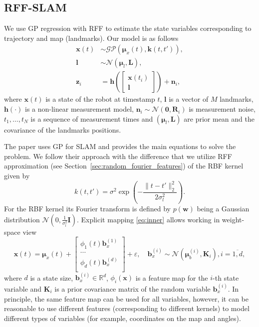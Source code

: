 \subsection{RFF-SLAM}

We use GP regression with RFF to estimate the state variables corresponding to trajectory and map (landmarks).
Our model is as follows
\begin{equation}
\label{eq:gp_slam_model}
    \begin{aligned}
        \bm{x}(t) &\sim \mathcal{GP}(\bm{\mu}_x(t), \bm{k}(t, t')), \\
        \bm{l} &\sim \mathcal{N}(\bm{\mu}_l, \mathbf{L}), \\
        \bm{z}_i &= \bm{h}\left (
        \begin{bmatrix}
            {\bm x}(t_i) \\
            {\bm l}
        \end{bmatrix}
        \right ) + \bm{n}_i,
    \end{aligned}
\end{equation}
where ${\bm x}(t)$ is a state of the robot at timestamp $t$,
${\bm l}$ is a vector of $M$ landmarks,
$\bm{h}(\cdot)$ is a non-linear measurement model,
$\bm{n}_i \sim \mathcal{N}(\bm{0}, \mathbf{R}_i)$ is measurement noise,
$t_1, \ldots, t_N$ is a sequence of measurement times and
$(\bm{\mu}_l, \mathbf{L})$ are prior mean and the covariance of the landmarks positions.

The paper \cite{tong2013gaussian} uses GP for SLAM and provides the main equations to solve the problem.
We follow their approach with the difference that we utilize RFF approximation
(see Section~\ref{sec:random_fourier_features}) of the RBF kernel given by
\[
k(t, t') = \sigma^2 \exp \left ( -\frac{\|t - t'\|_2^2}{2 \sigma_l^2} \right ).
\]
For the RBF kernel its Fourier transform is defined by $p(\bm{w})$ being a Gaussian distribution $\mathcal{N}\left (0, \frac{1}{\sigma_l^2}\mathbf{I} \right )$.
Explicit mapping \eqref{eq:inner} allows working in
weight-space view
\[
{\bm x}(t) = {\bm \mu}_x(t) + \begin{bmatrix}
        \phi_1(t) {\bm b}_x^{(1)} \\
        \cdots \\
        \phi_d(t) {\bm b}_x^{(d)} \\
    \end{bmatrix}
    + \varepsilon,
    \quad {\bm b}_x^{(i)} \sim \mathcal{N}({\bm \mu}_b^{(i)}, \mathbf{K}_i), i = \overline{1, d},
\]
where $d$ is a state size,
${\bm b}_x^{(i)} \in \mathbb{R}^d$,
$\phi_i({\bm x})$ is a feature map for the $i$-th state variable
and $\mathbf{K}_i$ is a prior covariance matrix of the random variable
${\bm b}_x^{(i)}$.
In principle, the same feature map can be used for all variables,
however, it can be reasonable to use different features
(corresponding to different kernels) to model different types of variables
(for example, coordinates on the map and angles).

